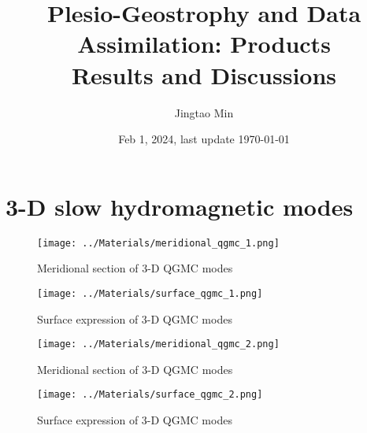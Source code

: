 \documentclass[a4paper, 11pt]{report}
\title{Plesio-Geostrophy and Data Assimilation: Products \\ {\Large Results and Discussions}}
\author{Jingtao Min}
\date{Feb 1, 2024, last update \today}
\begin{document}
\maketitle



\appendix

\chapter{3-D slow hydromagnetic modes}

\begin{figure}[htbp]
    \centering
    \texttt{[image: ../Materials/meridional\_qgmc\_1.png]}
    \caption{Meridional section of 3-D QGMC modes}
\end{figure}

\begin{figure}[htbp]
    \centering
    \texttt{[image: ../Materials/surface\_qgmc\_1.png]}
    \caption{Surface expression of 3-D QGMC modes}
\end{figure}

\begin{figure}[htbp]
    \centering
    \texttt{[image: ../Materials/meridional\_qgmc\_2.png]}
    \caption{Meridional section of 3-D QGMC modes}
\end{figure}

\begin{figure}[htbp]
    \centering
    \texttt{[image: ../Materials/surface\_qgmc\_2.png]}
    \caption{Surface expression of 3-D QGMC modes}
\end{figure}


\printbibliography
\end{document}
